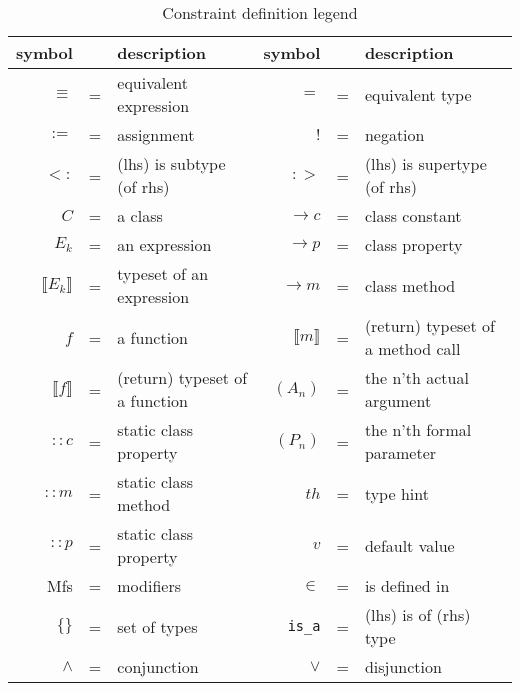 \documentclass[../main.tex]{subfiles}
\begin{document}
    \begin{table}[H]
    	\center
        \begin{tabular}{ r c l | r c l }
        	\toprule
        	symbol & & description &
        	symbol & & description \\
        	\midrule

            $\equiv$ & = & equivalent expression &
            $=$     & = & equivalent type \\

            $:=$    & = & assignment &
            $!$     & = & negation \\

            $<:$    & = & (lhs) is subtype (of rhs) &
            $:>$    & = & (lhs) is supertype (of rhs) \\

            $C$    & = & a class &
            $\rightarrow c$     & = & class constant \\

            $E_k$   & = & an expression &
            $\rightarrow p$     & = & class property \\

            $\llbracket{}E_k\rrbracket{}$ & = & typeset of an expression &
            $\rightarrow m$     & = & class method \\

            $f$     & = & a function &
            $\llbracket{}m\rrbracket{}$   & = & (return) typeset of a method call \\

            $\llbracket{}f\rrbracket{}$   & = & (return) typeset of a function &
            $(A_n)$ & = & the n'th actual argument \\

            $::c$   & = & static class property &
            $(P_n)$ & = & the n'th formal parameter \\

            $::m$   & = & static class method &
            $th$    & = & type hint \\

            $::p$   & = & static class property &
            $v$     & = & default value \\

            Mfs     & = & modifiers &
            $\in$ & = & is defined in \\

            $\{ \}$     & = & set of types &
            \texttt{is\_a} & = & (lhs) is of (rhs) type \\

            $\land$ & = & conjunction &
            $\lor$   & = & disjunction

        \end{tabular}
        \caption{Constraint definition legend}
        \label{table:constraintLegend}
   \end{table}
\end{document}
